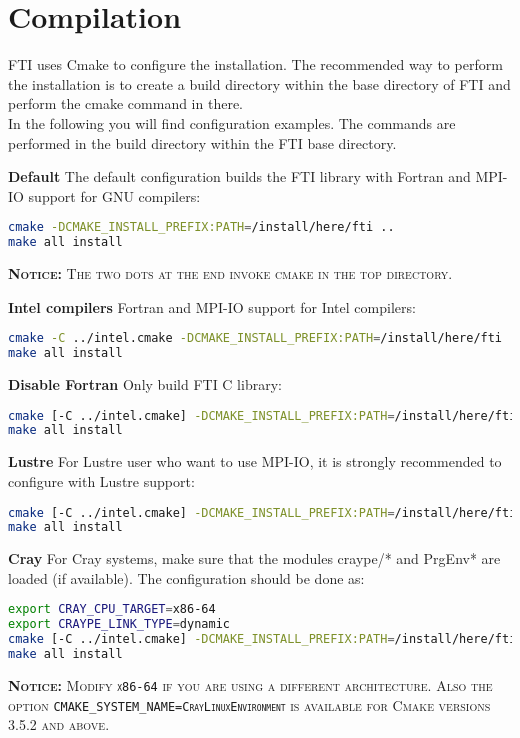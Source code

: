 \documentclass{refrep}
\begin{document}
\chapter{Compilation}
FTI uses Cmake to configure the installation. The recommended way to perform the installation is to create a build directory within the base directory of FTI and perform the cmake command in there. \\
In the following you will find configuration examples. The commands are performed in the build directory within the FTI base directory.

\vspace{2mm}
{\bf Default}
The default configuration builds the FTI library with Fortran and MPI-IO support for GNU compilers:
\begin{lstlisting}[language=bash]
cmake -DCMAKE_INSTALL_PREFIX:PATH=/install/here/fti ..
make all install
\end{lstlisting}
\begin{tcolorbox}
    \textsc{{\bf Notice:} The two dots at the end invoke cmake in the top directory.}
\end{tcolorbox}

\vspace{2mm}
{\bf Intel compilers}
Fortran and MPI-IO support for Intel compilers:
\begin{lstlisting}[language=bash]
cmake -C ../intel.cmake -DCMAKE_INSTALL_PREFIX:PATH=/install/here/fti ..
make all install
\end{lstlisting}

\vspace{2mm}
{\bf Disable Fortran}
Only build FTI C library:
\begin{lstlisting}[language=bash]
cmake [-C ../intel.cmake] -DCMAKE_INSTALL_PREFIX:PATH=/install/here/fti -DENABLE_FORTRAN=OFF ..
make all install
\end{lstlisting}

\vspace{2mm}
{\bf Lustre}
For Lustre user who want to use MPI-IO, it is strongly recommended to configure with Lustre support:
\begin{lstlisting}[language=bash]
cmake [-C ../intel.cmake] -DCMAKE_INSTALL_PREFIX:PATH=/install/here/fti -DENABLE_LUSTRE=ON ..
make all install
\end{lstlisting}

\vspace{2mm}
{\bf Cray}
For Cray systems, make sure that the modules craype/* and PrgEnv* are loaded (if available). The configuration should be done as:
\begin{lstlisting}[language=bash]
export CRAY_CPU_TARGET=x86-64
export CRAYPE_LINK_TYPE=dynamic
cmake [-C ../intel.cmake] -DCMAKE_INSTALL_PREFIX:PATH=/install/here/fti -DCMAKE_SYSTEM_NAME=CrayLinuxEnvironment ..
make all install
\end{lstlisting}
\begin{tcolorbox}
    \textsc{{\bf Notice:} Modify {\tt x86-64} if you are using a different architecture. Also the option {\tt CMAKE\_SYSTEM\_NAME=CrayLinuxEnvironment} is available for Cmake versions 3.5.2 and above.}
\end{tcolorbox}
\end{document}
